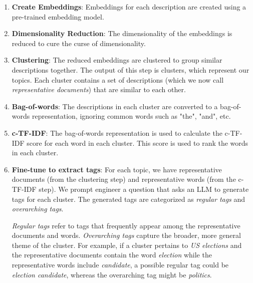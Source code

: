 \begin{enumerate}
    \item \textbf{Create Embeddings}: Embeddings for each description are created using a pre-trained embedding model.
    \item \textbf{Dimensionality Reduction}: The dimensionality of the embeddings is reduced to cure the curse of dimensionality.
    \item \textbf{Clustering}: The reduced embeddings are clustered to group similar descriptions together. The output of this step is clusters, which represent our topics. Each cluster contains a set of descriptions (which we now call \textit{representative documents}) that are similar to each other.
    \item \textbf{Bag-of-words}: The descriptions in each cluster are converted to a bag-of-words representation, ignoring common words such as "the", "and", etc.
    \item \textbf{c-TF-IDF}: The bag-of-words representation is used to calculate the c-TF-IDF score for each word in each cluster. This score is used to rank the words in each cluster.
    \item \textbf{Fine-tune to extract tags}: For each topic, we have representative documents (from the clustering step) and representative words (from the c-TF-IDF step). We prompt engineer a question that asks an LLM to generate tags for each cluster. The generated tags are categorized as \textit{regular tags} and \textit{overarching tags}.

    \textit{Regular tags} refer to tags that frequently appear among the representative documents and words. \textit{Overarching tags} capture the broader, more general theme of the cluster. For example, if a cluster pertains to \textit{US elections} and the representative documents contain the word \textit{election} while the representative words include \textit{candidate}, a possible regular tag could be \textit{election candidate}, whereas the overarching tag might be \textit{politics}.


\end{enumerate}
